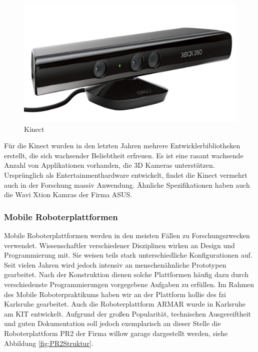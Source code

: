 \begin{figure}[h]
\center
\includegraphics[scale=0.3]{graphics/Kinect.jpg}
\caption{\label{fig:Kinect} Kinect}
\end{figure}

Für die Kinect wurden in den letzten Jahren mehrere Entwicklerbibliotheken erstellt,
 die sich wachsender Beliebtheit erfreuen. Es ist eine rasant wachsende Anzahl von Applikationen vorhanden,
 die 3D Kameras unterstützen. Ursprünglich als Entertainmenthardware entwickelt,
 findet die Kinect vermehrt auch in der Forschung massiv Anwendung.
 Ähnliche Spezifikationen haben auch die Wavi Xtion Kamras der Firma ASUS.

\subsubsection{Mobile Roboterplattformen}

Mobile Roboterplattformen werden in den meisten Fällen zu Forschungszwecken verwendet.
 Wissenschaftler verschiedener Disziplinen wirken an Design und Programmierung mit.
 Sie weisen teils stark unterschiedliche Konfigurationen auf.
 Seit vielen Jahren wird jedoch intensiv an menschenähnliche Prototypen gearbeitet.
 Nach der Konstruktion dienen solche Plattformen häufig dazu durch verschiedenste Programmierungen
 vorgegebene Aufgaben zu erfüllen. Im Rahmen des Mobile Roboterpraktikums haben
 wir an der Plattform \gls{hollie} des \gls{fzi} Karlsruhe gearbeitet. Auch die
 Roboterplattform ARMAR wurde in Karlsruhe am KIT entwickelt.
 Aufgrund der großen Popularität, technischen Ausgereiftheit und guten
 Dokumentation soll jedoch exemplarisch an dieser Stelle die Roboterplattform
 PR2 der Firma willow garage dargestellt werden, siehe Abbildung
 \ref{fig:PR2Struktur}.

